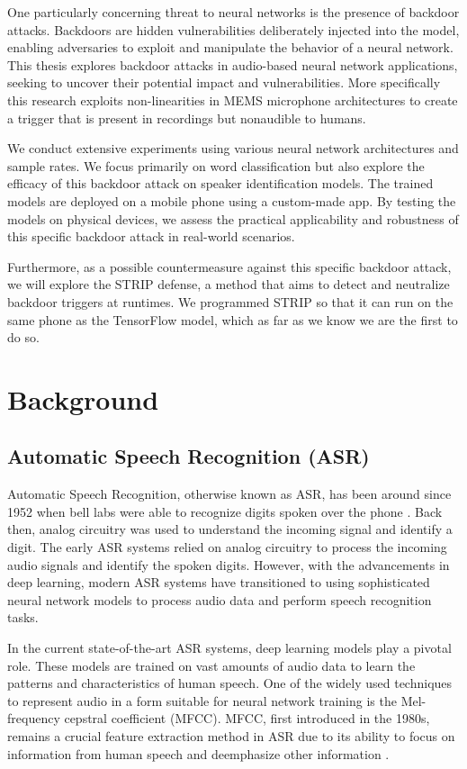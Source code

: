 \documentclass{report}
\theoremstyle{definition}
\theoremstyle{remark}
\begin{document}
One particularly concerning threat to neural networks is the presence of backdoor attacks. Backdoors are hidden vulnerabilities deliberately injected into the model, enabling adversaries to exploit and manipulate the behavior of a neural network. This thesis explores backdoor attacks in audio-based neural network applications, seeking to uncover their potential impact and vulnerabilities. More specifically this research exploits non-linearities in MEMS microphone architectures to create a trigger that is present in recordings but nonaudible to humans. 

We conduct extensive experiments using various neural network architectures and sample rates. We focus primarily on word classification but also explore the efficacy of this backdoor attack on speaker identification models. The trained models are deployed on a mobile phone using a custom-made app. By testing the models on physical devices, we assess the practical applicability and robustness of this specific backdoor attack in real-world scenarios.

Furthermore, as a possible countermeasure against this specific backdoor attack, we will explore the STRIP defense, a method that aims to detect and neutralize backdoor triggers at runtimes. We programmed STRIP so that it can run on the same phone as the TensorFlow model, which as far as we know we are the first to do so.

\chapter{Background}
\section{Automatic Speech Recognition (ASR)}
Automatic Speech Recognition, otherwise known as ASR, has been around since 1952 when bell labs were able to recognize digits spoken over the phone \cite{ASRHistory}. Back then, analog circuitry was used to understand the incoming signal and identify a digit. The early ASR systems relied on analog circuitry to process the incoming audio signals and identify the spoken digits. However, with the advancements in deep learning, modern ASR systems have transitioned to using sophisticated neural network models to process audio data and perform speech recognition tasks.

In the current state-of-the-art ASR systems, deep learning models play a pivotal role. These models are trained on vast amounts of audio data to learn the patterns and characteristics of human speech. One of the widely used techniques to represent audio in a form suitable for neural network training is the Mel-frequency cepstral coefficient (MFCC). MFCC, first introduced in the 1980s, remains a crucial feature extraction method in ASR due to its ability to focus on information from human speech and deemphasize other information \cite{dave2013feature}.
\end{document}
